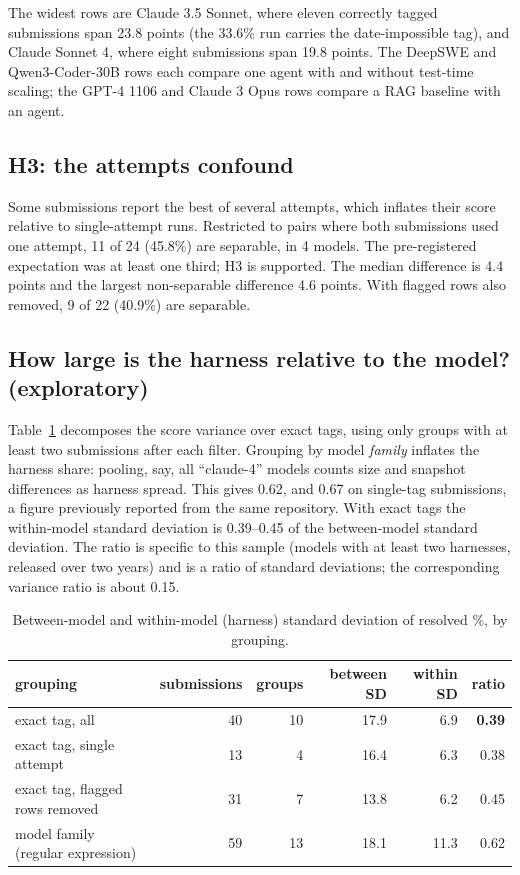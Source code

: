 \documentclass[10pt]{article}
\begin{document}
The widest rows are Claude 3.5 Sonnet, where eleven correctly tagged submissions span 23.8 points (the 33.6\% run carries the date-impossible tag), and Claude Sonnet 4, where eight submissions span 19.8 points. The DeepSWE and Qwen3-Coder-30B rows each compare one agent with and without test-time scaling; the GPT-4 1106 and Claude 3 Opus rows compare a RAG baseline with an agent.

\subsection{H3: the attempts confound}

Some submissions report the best of several attempts, which inflates their score relative to single-attempt runs. Restricted to pairs where both submissions used one attempt, 11 of 24 (45.8\%) are separable, in 4 models. The pre-registered expectation was at least one third; H3 is supported. The median difference is 4.4 points and the largest non-separable difference 4.6 points. With flagged rows also removed, 9 of 22 (40.9\%) are separable.

\subsection{How large is the harness relative to the model? (exploratory)}

Table~\ref{tab:var} decomposes the score variance over exact tags, using only groups with at least two submissions after each filter. Grouping by model \emph{family} inflates the harness share: pooling, say, all ``claude-4'' models counts size and snapshot differences as harness spread. This gives 0.62, and 0.67 on single-tag submissions, a figure previously reported from the same repository. With exact tags the within-model standard deviation is 0.39--0.45 of the between-model standard deviation. The ratio is specific to this sample (models with at least two harnesses, released over two years) and is a ratio of standard deviations; the corresponding variance ratio is about 0.15.

\begin{table}[t]
\centering
\caption{Between-model and within-model (harness) standard deviation of resolved \%, by grouping.}
\label{tab:var}
\begin{tabular}{lrrrrr}
\toprule
grouping & submissions & groups & between SD & within SD & ratio \\
\midrule
exact tag, all & 40 & 10 & 17.9 & 6.9 & \textbf{0.39} \\
exact tag, single attempt & 13 & 4 & 16.4 & 6.3 & 0.38 \\
exact tag, flagged rows removed & 31 & 7 & 13.8 & 6.2 & 0.45 \\
model family (regular expression) & 59 & 13 & 18.1 & 11.3 & 0.62 \\
\bottomrule
\end{tabular}
\end{table}
\end{document}
